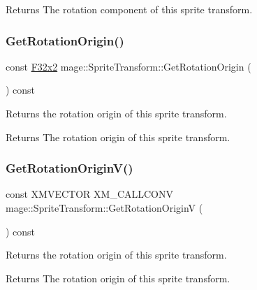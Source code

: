 \begin{DoxyReturn}{Returns}
The rotation component of this sprite transform. 
\end{DoxyReturn}
\mbox{\label{classmage_1_1_sprite_transform_a5c538636df465016643a370a9f820865}} 
\subsubsection{\texorpdfstring{Get\+Rotation\+Origin()}{GetRotationOrigin()}}
{\footnotesize\ttfamily const \mbox{\hyperlink{namespacemage_a9dc0d34d6ecc87e4cfa4a826102117bc}{F32x2}} mage\+::\+Sprite\+Transform\+::\+Get\+Rotation\+Origin (\begin{DoxyParamCaption}{ }\end{DoxyParamCaption}) const\hspace{0.3cm}{\ttfamily [noexcept]}}

Returns the rotation origin of this sprite transform.

\begin{DoxyReturn}{Returns}
The rotation origin of this sprite transform. 
\end{DoxyReturn}
\mbox{\label{classmage_1_1_sprite_transform_a49349d65ad063a1519b6699087d9b790}} 
\subsubsection{\texorpdfstring{Get\+Rotation\+Origin\+V()}{GetRotationOriginV()}}
{\footnotesize\ttfamily const X\+M\+V\+E\+C\+T\+OR X\+M\+\_\+\+C\+A\+L\+L\+C\+O\+NV mage\+::\+Sprite\+Transform\+::\+Get\+Rotation\+OriginV (\begin{DoxyParamCaption}{ }\end{DoxyParamCaption}) const\hspace{0.3cm}{\ttfamily [noexcept]}}

Returns the rotation origin of this sprite transform.

\begin{DoxyReturn}{Returns}
The rotation origin of this sprite transform. 
\end{DoxyReturn}
\mbox{\label{classmage_1_1_sprite_transform_a980beb77dc4b64a2d784361d61981f9c}} 

